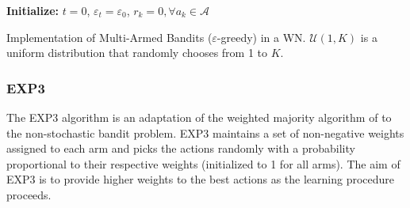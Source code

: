 \documentclass[preprint,12pt]{elsarticle}
\begin{document}
	\begin{algorithm}[H]	
		\SetAlgoLined
		\textbf{Initialize:} $t=0$, $\varepsilon_t = \varepsilon_0$, $r_{k} = 0, \forall a_k \in \mathcal{A}$\\
		\caption{Implementation of Multi-Armed Bandits ($\varepsilon$-greedy) in a WN. $\mathcal{U}(1, K)$ is a uniform distribution that randomly chooses from 1 to $K$.}
		\label{alg:egreedy}			
	\end{algorithm}
	
	\subsubsection{EXP3}
	\label{section:bandits_exp3}	
	The EXP3 algorithm \cite{auer1995gambling,auer2002nonstochastic} is an adaptation of the weighted majority algorithm of \cite{LW94,FS97} to the non-stochastic bandit problem. EXP3 maintains a set of non-negative weights assigned to each arm and picks the actions randomly with a probability proportional to their respective weights (initialized to 1 for all arms). The aim of EXP3 is to provide higher weights to the best actions as the learning procedure proceeds. 
	
\end{document}

